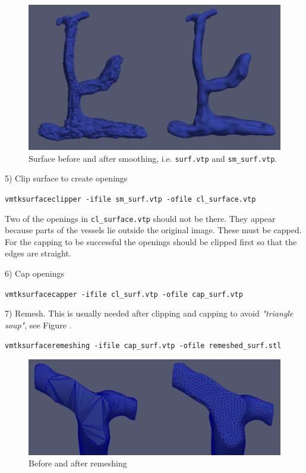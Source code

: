 \documentclass[epsfig,11pt]{article}
\begin{document}
\begin{figure}[h!] 
\begin{center}
  \includegraphics[scale=0.3]{smoothing.png}
  \end{center}
  \caption{Surface before and after smoothing, i.e. \texttt{surf.vtp} and \texttt{sm\_surf.vtp}.}
\end{figure}

5) Clip surface to create openings
\begin{framed}       
    \texttt{vmtksurfaceclipper -ifile sm\_surf.vtp -ofile cl\_surface.vtp}
\end{framed}

Two of the openings in \texttt{cl\_surface.vtp} should not be there. They appear because parts of the vessels lie outside the original image. These must be capped. For the capping to be successful the openings should be clipped first so that the edges are straight.

6) Cap openings 
\begin{framed}    
\texttt{vmtksurfacecapper -ifile cl\_surf.vtp -ofile cap\_surf.vtp}
\end{framed}
7) Remesh. This is usually needed after clipping and capping to avoid \emph{"triangle soup"}, see Figure 	. 
\begin{framed}    
\texttt{vmtksurfaceremeshing -ifile cap\_surf.vtp -ofile remeshed\_surf.stl}
\end{framed}

\begin{figure}[h!] 
\begin{center}
  \includegraphics[scale=0.3]{remsh.png}
  \end{center}
  \caption{Before and after remeshing}
\end{figure}
\end{document}
